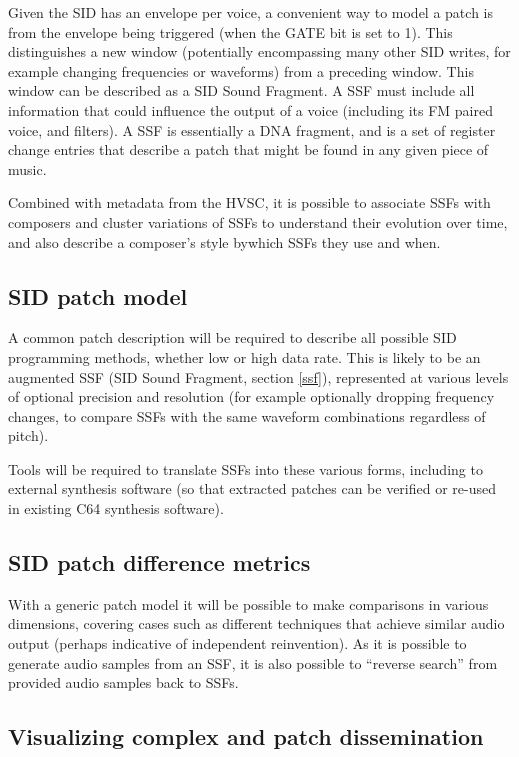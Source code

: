 \documentclass[10pt]{article}
\begin{document}
\begin{multicols*}{2}
Given the SID has an envelope per voice, a convenient way to model a patch is from the envelope being triggered (when the GATE bit is set to 1). This distinguishes a new window (potentially encompassing many other SID writes, for example changing frequencies or waveforms) from a preceding window. This window can be described as a SID Sound Fragment. A SSF must include all information that could influence the output of a voice (including its FM paired voice, and filters). A SSF is essentially a DNA fragment, and is a set of register change entries that describe a patch that might be found in any given piece of music.

Combined with metadata from the HVSC, it is possible to associate SSFs with composers and cluster variations of SSFs to understand their evolution over time, and also describe a composer's style bywhich SSFs they use and when.

\subsection{SID patch model}

A common patch description will be required to describe all possible SID programming methods, whether low or high data rate. This is likely to be an augmented SSF (SID Sound Fragment, section \ref{ssf}), represented at various levels of optional precision and resolution (for example optionally dropping frequency changes, to compare SSFs with the same waveform combinations regardless of pitch).

Tools will be required to translate SSFs into these various forms, including to external synthesis software (so that extracted patches can be verified or re-used in existing C64 synthesis software).

\subsection{SID patch difference metrics}

With a generic patch model it will be possible to make comparisons in various dimensions, covering cases such as different techniques that achieve similar audio output (perhaps indicative of independent reinvention). As it is possible to generate audio samples from an SSF, it is also possible to “reverse search” from provided audio samples back to SSFs.

\subsection{Visualizing complex and patch dissemination}


\end{multicols*}
\end{document}

